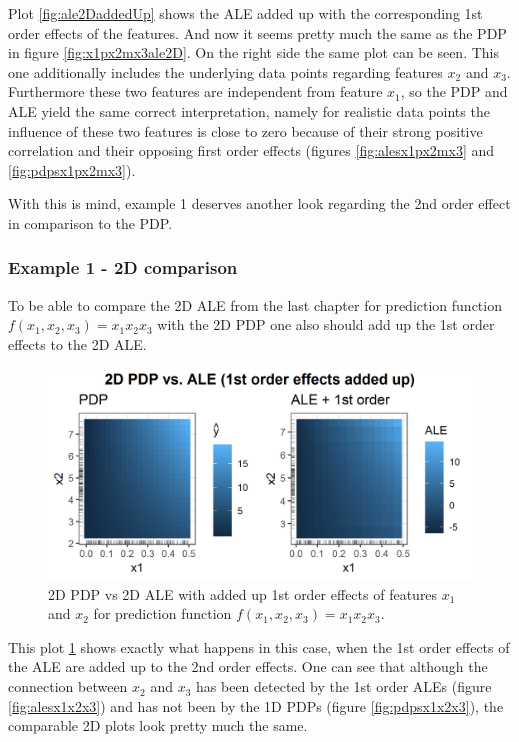 \documentclass[
]{krantz}
\begin{document}
Plot \ref{fig:ale2DaddedUp} shows the ALE added up with the corresponding 1st order effects of the features. And now it seems pretty much the same as the PDP in figure \ref{fig:x1px2mx3ale2D}. On the right side the same plot can be seen. This one additionally includes the underlying data points regarding features \(x_2\) and \(x_3\). Furthermore these two features are independent from feature \(x_1\), so the PDP and ALE yield the same correct interpretation, namely for realistic data points the influence of these two features is close to zero because of their strong positive correlation and their opposing first order effects (figures \ref{fig:alesx1px2mx3} and \ref{fig:pdpsx1px2mx3}).

With this is mind, example 1 deserves another look regarding the 2nd order effect in comparison to the PDP.

\hypertarget{example-1---2d-comparison}{%
\subsubsection{Example 1 - 2D comparison}\label{example-1---2d-comparison}}

To be able to compare the 2D ALE from the last chapter for prediction function \(f(x_1, x_2, x_3) = x_1 x_2 x_3\) with the 2D PDP one also should add up the 1st order effects to the 2D ALE.

\begin{figure}
\includegraphics[width=1\linewidth]{images/ale_1_comp_2d_1st_orders_added_x1x2x3_150_0_0p5_5_1} \caption{2D PDP vs 2D ALE with added up 1st order effects of features \(x_1\) and \(x_2\) for prediction function \(f(x_1, x_2, x_3) = x_1 x_2 x_3\).}\label{fig:ale2DaddedUpx1x2x3}
\end{figure}



This plot \ref{fig:ale2DaddedUpx1x2x3} shows exactly what happens in this case, when the 1st order effects of the ALE are added up to the 2nd order effects. One can see that although the connection between \(x_2\) and \(x_3\) has been detected by the 1st order ALEs (figure \ref{fig:alesx1x2x3}) and has not been by the 1D PDPs (figure \ref{fig:pdpsx1x2x3}), the comparable 2D plots look pretty much the same.
\end{document}
